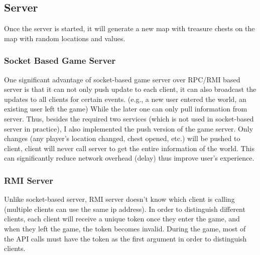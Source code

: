 \documentclass[11pt, oneside]{article}   	%
\begin{document}
\subsection{Server}
Once the server is started, it will generate a new map with treasure chests on the map with random locations and values.

\subsubsection{Socket Based Game Server}
One significant advantage of socket-based game server over RPC/RMI based server is that it can not only push update to each client, it can also broadcast the updates to all clients for certain events. (e.g., a new user entered the world, an existing user left the game)
While the later one can only pull information from server. Thus, besides the required two services (which is not used in socket-based server in practice), I also implemented the push version of the game server. Only changes (any player's location changed, chest opened, etc.) will be pushed to client, client will never call server to get the entire information of the world. This can significantly reduce network overhead (delay) thus improve user's experience.

\subsubsection{RMI Server}
Unlike socket-based server, RMI server doesn't know which client is calling (multiple clients can use the same ip address). In order to distinguish different clients, each client will receive a unique token once they enter the game, and when they left the game, the token becomes invalid. During the game, most of the API calls must have the token as the first argument in order to distinguish clients.
\end{document}
